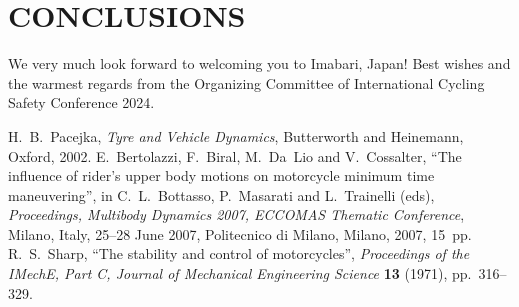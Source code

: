 \documentclass{icsc}
\begin{document}
\section{CONCLUSIONS}
%
We very much look forward to welcoming you to Imabari, Japan! Best wishes and
the warmest regards from the Organizing Committee of International Cycling
Safety Conference 2024.

\begin{thebibliography}{6}
   H.~B.~Pacejka, \textit{Tyre and Vehicle Dynamics},
    Butterworth and Heinemann, Oxford, 2002.
   E.~Bertolazzi, F.~Biral, M.~Da~Lio and V.~Cossalter, ``The
    influence of rider's upper body motions on motorcycle minimum time
    maneuvering'', in C.~L.~Bottasso, P.~Masarati and L.~Trainelli (eds),
    \textit{Proceedings, Multibody Dynamics 2007, ECCOMAS Thematic Conference},
    Milano, Italy, 25--28 June 2007, Politecnico di Milano, Milano, 2007,
    15~pp.
   R.~S.~Sharp, ``The stability and control of motorcycles'',
    \textit{Proceedings of the IMechE, Part C, Journal of Mechanical
    Engineering Science} \textbf{13} (1971), pp.~316--329.
\end{thebibliography}
\thispagestyle{empty}
\end{document}
